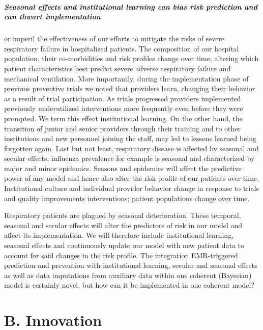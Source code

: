 \documentclass[11pt,notitlepage]{article}
\begin{document}
\subparagraph*{Seasonal effects and institutional learning can bias risk prediction and can thwart implementation} or imperil the effectiveness of our efforts to mitigate the risks of severe respiratory failure in hospitalized patients. The composition of our hospital population, their co-morbidities and risk profiles change over time, altering which patient characteristics best predict severe adverse respiratory failure and mechanical ventilation. More importantly,  during the implementation phase of previous preventive trials we noted that providers learn, changing their behavior as a result of trial participation. As trials progressed providers implemented previously underutilized interventions more frequently even before they were prompted. We term this effect institutional learning. On the other hand, the transition of junior and senior providers through their training and to other institutions and new personnel joining the staff, may led to lessons learned being forgotten again. Last but not least, respiratory disease is affected by seasonal and secular effects; influenza prevalence for example is seasonal and characterized by major and minor epidemics. Seasons and epidemics will affect the predictive power of any model and hence also alter the risk profile of our patients over time. Institutional culture and individual provider behavior change in response to trials and quality improvements interventions; patient populations change over time. 

Respiratory patients are plagued by seasonal deterioration. These temporal, seasonal and secular effects will alter the predictors of risk in our model and affect its implementation. We will therefore include institutional learning, seasonal effects and continuously update our model with new patient data to account for said changes in the risk profile. The integration EMR-triggered prediction and prevention with  institutional learning, secular and seasonal effects as well as data imputations from auxiliary data within one coherent (Bayesian) model is certainly novel, but how can it be implemented in one coherent model? 
\vspace{30pt}

\section*{B. Innovation}
\end{document}
